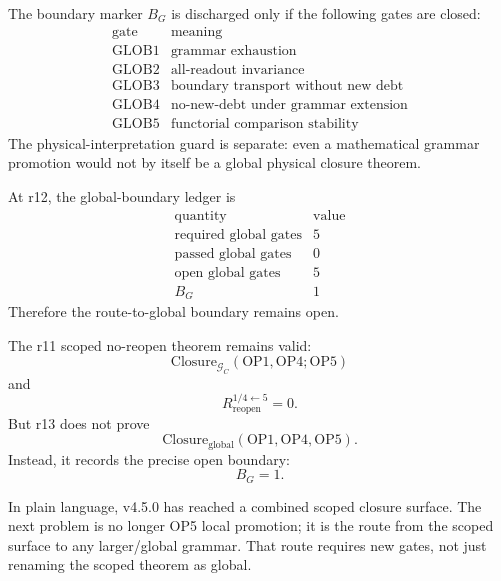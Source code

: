 \begin{definition}
The boundary marker \(B_G\) is discharged only if the following gates are
closed:
\[
\begin{array}{c|l}
\text{gate} & \text{meaning}\\
\hline
\mathrm{GLOB1} & \text{grammar exhaustion}\\
\mathrm{GLOB2} & \text{all-readout invariance}\\
\mathrm{GLOB3} & \text{boundary transport without new debt}\\
\mathrm{GLOB4} & \text{no-new-debt under grammar extension}\\
\mathrm{GLOB5} & \text{functorial comparison stability}
\end{array}
\]
The physical-interpretation guard is separate: even a mathematical grammar
promotion would not by itself be a global physical closure theorem.
\end{definition}

\begin{proposition}
At r12, the global-boundary ledger is
\[
\begin{array}{c|r}
\text{quantity} & \text{value}\\
\hline
\text{required global gates} & 5\\
\text{passed global gates} & 0\\
\text{open global gates} & 5\\
B_G & 1
\end{array}
\]
Therefore the route-to-global boundary remains open.
\end{proposition}

\begin{theorem}
The r11 scoped no-reopen theorem remains valid:
\[
    \mathrm{Closure}_{\mathcal G_C}(\mathrm{OP1},\mathrm{OP4};\mathrm{OP5})
\]
and
\[
    R_{\mathrm{reopen}}^{1/4\leftarrow 5}=0.
\]
But r13 does not prove
\[
    \mathrm{Closure}_{\mathrm{global}}(\mathrm{OP1},\mathrm{OP4},\mathrm{OP5}).
\]
Instead, it records the precise open boundary:
\[
    B_G=1.
\]
\end{theorem}

\begin{remark}[Interpretation]
In plain language, v4.5.0 has reached a combined scoped closure surface.  The
next problem is no longer OP5 local promotion; it is the route from the scoped
surface to any larger/global grammar.  That route requires new gates, not just
renaming the scoped theorem as global.
\end{remark}


